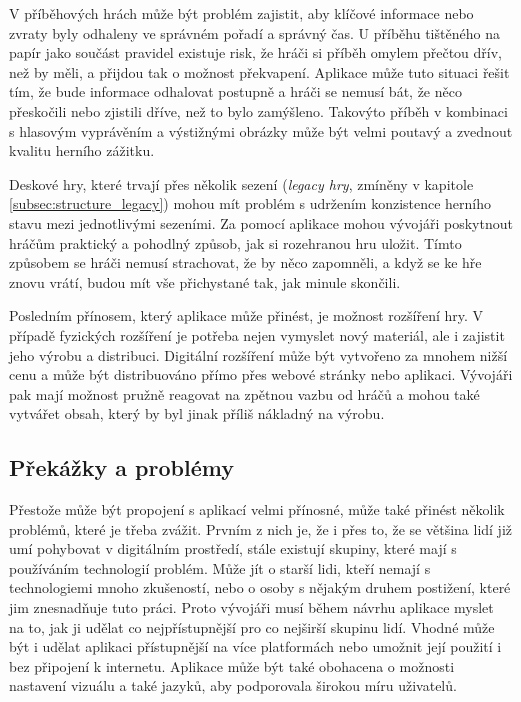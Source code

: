 V příběhových hrách může být problém zajistit, aby klíčové informace nebo zvraty byly odhaleny ve správném pořadí a správný čas. U příběhu tištěného na papír jako součást pravidel existuje risk, že hráči si příběh omylem přečtou dřív, než by měli, a přijdou tak o možnost překvapení. Aplikace může tuto situaci řešit tím, že bude informace odhalovat postupně a hráči se nemusí bát, že něco přeskočili nebo zjistili dříve, než to bylo zamýšleno. Takovýto příběh v kombinaci s hlasovým vyprávěním a výstižnými obrázky může být velmi poutavý a zvednout kvalitu herního zážitku.

Deskové hry, které trvají přes několik sezení (\textit{legacy hry}, zmíněny v kapitole \ref{subsec:structure_legacy}) mohou mít problém s udržením konzistence herního stavu mezi jednotlivými sezeními. Za pomocí aplikace mohou vývojáři poskytnout hráčům praktický a pohodlný způsob, jak si rozehranou hru uložit. Tímto způsobem se hráči nemusí strachovat, že by něco zapomněli, a když se ke hře znovu vrátí, budou mít vše přichystané tak, jak minule skončili.

Posledním přínosem, který aplikace může přinést, je možnost rozšíření hry. V případě fyzických rozšíření je potřeba nejen vymyslet nový materiál, ale i zajistit jeho výrobu a distribuci. Digitální rozšíření může být vytvořeno za mnohem nižší cenu a může být distribuováno přímo přes webové stránky nebo aplikaci. Vývojáři pak mají možnost pružně reagovat na zpětnou vazbu od hráčů a mohou také vytvářet obsah, který by byl jinak příliš nákladný na výrobu.

\subsection{Překážky a problémy}
\label{subsec:apps_app_problems}

Přestože může být propojení s aplikací velmi přínosné, může také přinést několik problémů, které je třeba zvážit. Prvním z nich je, že i přes to, že se většina lidí již umí pohybovat v digitálním prostředí, stále existují skupiny, které mají s používáním technologií problém. Může jít o starší lidi, kteří nemají s technologiemi mnoho zkušeností, nebo o osoby s nějakým druhem postižení, které jim znesnadňuje tuto práci. Proto vývojáři musí během návrhu aplikace myslet na to, jak ji udělat co nejpřístupnější pro co nejširší skupinu lidí. Vhodné může být i udělat aplikaci přístupnější na více platformách nebo umožnit její použití i bez připojení k internetu. Aplikace může být také obohacena o možnosti nastavení vizuálu a také jazyků, aby podporovala širokou míru uživatelů.

